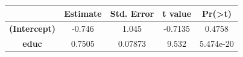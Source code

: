 \documentclass[]{article}
\begin{document}
\begin{longtable}[]{@{}ccccc@{}}
\toprule
\begin{minipage}[b]{0.21\columnwidth}\centering\strut
~\strut
\end{minipage} & \begin{minipage}[b]{0.13\columnwidth}\centering\strut
Estimate\strut
\end{minipage} & \begin{minipage}[b]{0.16\columnwidth}\centering\strut
Std. Error\strut
\end{minipage} & \begin{minipage}[b]{0.12\columnwidth}\centering\strut
t value\strut
\end{minipage} & \begin{minipage}[b]{0.13\columnwidth}\centering\strut
Pr(\textgreater{}\textbar{}t\textbar{})\strut
\end{minipage}\tabularnewline
\midrule
\endhead
\begin{minipage}[t]{0.21\columnwidth}\centering\strut
\textbf{(Intercept)}\strut
\end{minipage} & \begin{minipage}[t]{0.13\columnwidth}\centering\strut
-0.746\strut
\end{minipage} & \begin{minipage}[t]{0.16\columnwidth}\centering\strut
1.045\strut
\end{minipage} & \begin{minipage}[t]{0.12\columnwidth}\centering\strut
-0.7135\strut
\end{minipage} & \begin{minipage}[t]{0.13\columnwidth}\centering\strut
0.4758\strut
\end{minipage}\tabularnewline
\begin{minipage}[t]{0.21\columnwidth}\centering\strut
\textbf{educ}\strut
\end{minipage} & \begin{minipage}[t]{0.13\columnwidth}\centering\strut
0.7505\strut
\end{minipage} & \begin{minipage}[t]{0.16\columnwidth}\centering\strut
0.07873\strut
\end{minipage} & \begin{minipage}[t]{0.12\columnwidth}\centering\strut
9.532\strut
\end{minipage} & \begin{minipage}[t]{0.13\columnwidth}\centering\strut
5.474e-20\strut
\end{minipage}\tabularnewline
\bottomrule
\end{longtable}
\end{document}
